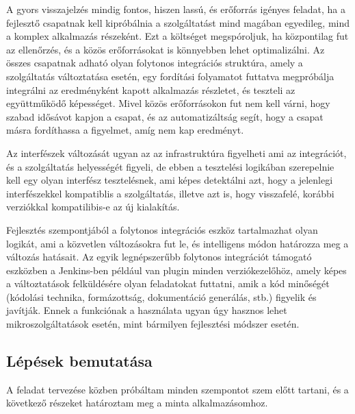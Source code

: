 \documentclass[11pt,magyar,a4paper,twoside,]{report}
\begin{document}
A gyors visszajelzés mindig fontos, hiszen lassú, és erőforrás igényes
feladat, ha a fejlesztő csapatnak kell kipróbálnia a szolgáltatást mind
magában egyedileg, mind a komplex alkalmazás részeként. Ezt a költséget
megspóroljuk, ha központilag fut az ellenőrzés, és a közös erőforrásokat
is könnyebben lehet optimalizálni. Az összes csapatnak adható olyan
folytonos integrációs struktúra, amely a szolgáltatás változtatása
esetén, egy fordítási folyamatot futtatva megpróbálja integrálni az
eredményként kapott alkalmazás részletet, és teszteli az együttműködő
képességet. Mivel közös erőforrásokon fut nem kell várni, hogy szabad
idősávot kapjon a csapat, és az automatizáltság segít, hogy a csapat
másra fordíthassa a figyelmet, amíg nem kap eredményt.

Az interfészek változását ugyan az az infrastruktúra figyelheti ami az
integrációt, és a szolgáltatás helyességét figyeli, de ebben a
tesztelési logikában szerepelnie kell egy olyan interfész tesztelésnek,
ami képes detektálni azt, hogy a jelenlegi interfészekkel kompatiblis a
szolgáltatás, illetve azt is, hogy visszafelé, korábbi verziókkal
kompatilibis-e az új kialakítás.

Fejlesztés szempontjából a folytonos integrációs eszköz tartalmazhat
olyan logikát, ami a közvetlen változásokra fut le, és intelligens módon
határozza meg a változás hatásait. Az egyik legnépszerűbb folytonos
integrációt támogató eszközben a Jenkins-ben például van plugin minden
verziókezelőhöz, amely képes a változtatások felküldésére olyan
feladatokat futtatni, amik a kód minőségét (kódolási technika,
formázottság, dokumentáció generálás, stb.) figyelik és javítják. Ennek
a funkciónak a használata ugyan úgy hasznos lehet mikroszolgáltatások
esetén, mint bármilyen fejlesztési módszer esetén.

\subsection{Lépések bemutatása}\label{luxe9puxe9sek-bemutatuxe1sa}

A feladat tervezése közben próbáltam minden szempontot szem előtt
tartani, és a következő részeket határoztam meg a minta alkalmazásomhoz.
\end{document}
